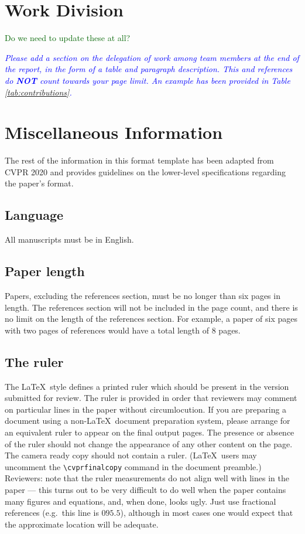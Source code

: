 \documentclass[10pt,twocolumn,letterpaper]{article}
\begin{document}
\section{Work Division}
\textcolor{darkgreen}{Do we need to update these at all?}

\textit{\textcolor{blue}{Please add a section on the delegation of work among team members at the end of the report, in the form of a table and paragraph description. This and references do \textbf{NOT} count towards your page limit. An example has been provided in Table \ref{tab:contributions}.}}

\newpage
\newpage
\section{Miscellaneous Information}

The rest of the information in this format template has been adapted from CVPR 2020 and provides guidelines on the lower-level specifications regarding the paper's format.

\subsection{Language}

All manuscripts must be in English.


\subsection{Paper length}
Papers, excluding the references section,
must be no longer than six pages in length. The references section
will not be included in the page count, and there is no limit on the
length of the references section. For example, a paper of six pages
with two pages of references would have a total length of 8 pages.

\subsection{The ruler}
The \LaTeX\ style defines a printed ruler which should be present in the
version submitted for review.  The ruler is provided in order that
reviewers may comment on particular lines in the paper without
circumlocution.  If you are preparing a document using a non-\LaTeX\
document preparation system, please arrange for an equivalent ruler to
appear on the final output pages.  The presence or absence of the ruler
should not change the appearance of any other content on the page.  The
camera ready copy should not contain a ruler. (\LaTeX\ users may uncomment
the \verb'\cvprfinalcopy' command in the document preamble.)  Reviewers:
note that the ruler measurements do not align well with lines in the paper
--- this turns out to be very difficult to do well when the paper contains
many figures and equations, and, when done, looks ugly.  Just use fractional
references (e.g.\ this line is $095.5$), although in most cases one would
expect that the approximate location will be adequate.
\end{document}
